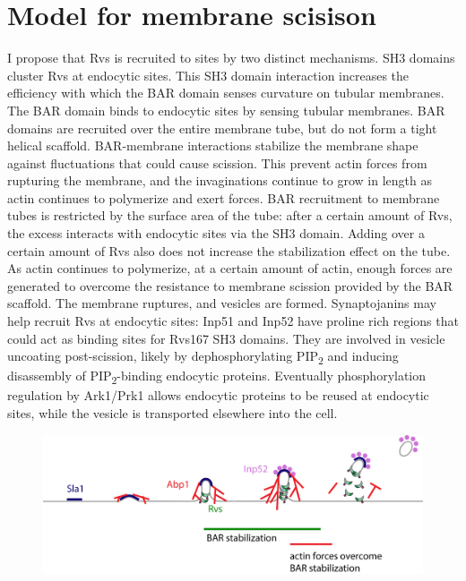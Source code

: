 \section{Model for membrane scisison}
I propose that Rvs is recruited to sites by two distinct mechanisms. SH3 domains cluster Rvs at endocytic sites. This SH3 domain interaction increases the efficiency with which the BAR domain senses curvature on tubular membranes. The BAR domain binds to endocytic sites by sensing tubular membranes. BAR domains are recruited over the entire membrane tube, but do not form a tight helical scaffold. BAR-membrane interactions stabilize the membrane shape against fluctuations that could cause scission. This prevent actin forces from rupturing the membrane, and the invaginations continue to grow in length as actin continues to polymerize and exert forces. BAR recruitment to membrane tubes is restricted by the surface area of the tube: after a certain amount of Rvs, the excess interacts with endocytic sites via the SH3 domain. Adding over a certain amount of Rvs also does not increase the stabilization effect on the tube. As actin continues to polymerize, at a certain amount of actin, enough forces are generated to overcome the resistance to membrane scission provided by the BAR scaffold. The membrane ruptures, and vesicles are formed. Synaptojanins may help recruit Rvs at endocytic sites: Inp51 and Inp52 have proline rich regions that could act as binding sites for Rvs167 SH3 domains. They are involved in vesicle uncoating post-scission, likely by dephosphorylating 	PIP\textsubscript{2} and inducing disassembly of 	PIP\textsubscript{2}-binding endocytic proteins. Eventually phosphorylation regulation by Ark1/Prk1 allows endocytic proteins to be reused at endocytic sites, while the vesicle is transported elsewhere into the cell. 

		\begin{figure}[H]
	\vspace*{-3 mm}
\includegraphics[scale=0.8]{figures/discussion/yeast_schematic_concl2}
	\caption [n]
	{ }
	\label{fig_scaffold}
\end{figure}





